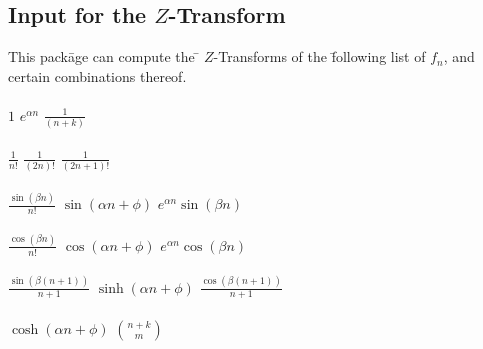 \subsection{Input for the $Z$-Transform}
\begin{tabbing}
  This pack\=age can compute the \= $Z$-Transforms of the \=following 
  list of $f_n$, and \\ certain combinations thereof.\\ \\

\>$1$                             
\>$e^{\alpha n}$                  
\>$\frac{1}{(n+k)}$               \\ \\
\>$\frac{1}{n!}$                  
\>$\frac{1}{(2n)!}$               
\>$\frac{1}{(2n+1)!}$             \\ \\
\>$\frac{\sin(\beta n)}{n!}$      
\>$\sin(\alpha n+\phi)$           
\>$e^{\alpha n} \sin(\beta n)$    \\ \\
\>$\frac{\cos(\beta n)}{n!}$      
\>$\cos(\alpha n+\phi)$           
\>$e^{\alpha n} \cos(\beta n)$    \\ \\
\>$\frac{\sin(\beta (n+1))}{n+1}$ 
\>$\sinh(\alpha n+\phi)$          
\>$\frac{\cos(\beta (n+1))}{n+1}$ \\ \\
\>$\cosh(\alpha n+\phi)$          
\>${n+k \choose m}$\\
\end{tabbing}

